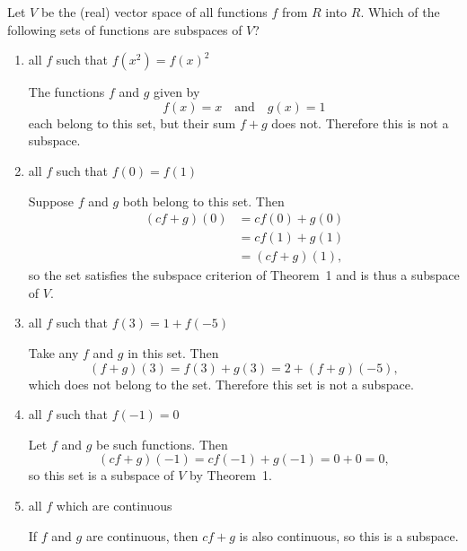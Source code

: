  Let $V$ be the (real) vector space of all functions $f$
from $R$ into $R$. Which of the following sets of functions are
subspaces of $V$?
\begin{enumerate}
\item all $f$ such that $f(x^2) = f(x)^2$
  \begin{solution}
    The functions $f$ and $g$ given by
    \begin{equation*}
      f(x) = x \quad\text{and}\quad g(x) = 1
    \end{equation*}
    each belong to this set, but their sum $f + g$ does not. Therefore
    this is not a subspace.
  \end{solution}
\item all $f$ such that $f(0) = f(1)$
  \begin{solution}
    Suppose $f$ and $g$ both belong to this set. Then
    \begin{align*}
      (cf + g)(0) &= cf(0) + g(0) \\
                  &= cf(1) + g(1) \\
                  &= (cf + g)(1),
    \end{align*}
    so the set satisfies the subspace criterion of Theorem~1 and is
    thus a subspace of $V$.
  \end{solution}
\item all $f$ such that $f(3) = 1 + f(-5)$
  \begin{solution}
    Take any $f$ and $g$ in this set. Then
    \begin{equation*}
      (f + g)(3) = f(3) + g(3) = 2 + (f + g)(-5),
    \end{equation*}
    which does not belong to the set. Therefore this set is not a
    subspace.
  \end{solution}
\item all $f$ such that $f(-1) = 0$
  \begin{solution}
    Let $f$ and $g$ be such functions. Then
    \begin{equation*}
      (cf + g)(-1) = cf(-1) + g(-1) = 0 + 0 = 0,
    \end{equation*}
    so this set is a subspace of $V$ by Theorem~1.
  \end{solution}
\item all $f$ which are continuous
  \begin{solution}
    If $f$ and $g$ are continuous, then $cf + g$ is also continuous,
    so this is a subspace.
  \end{solution}
\end{enumerate}

